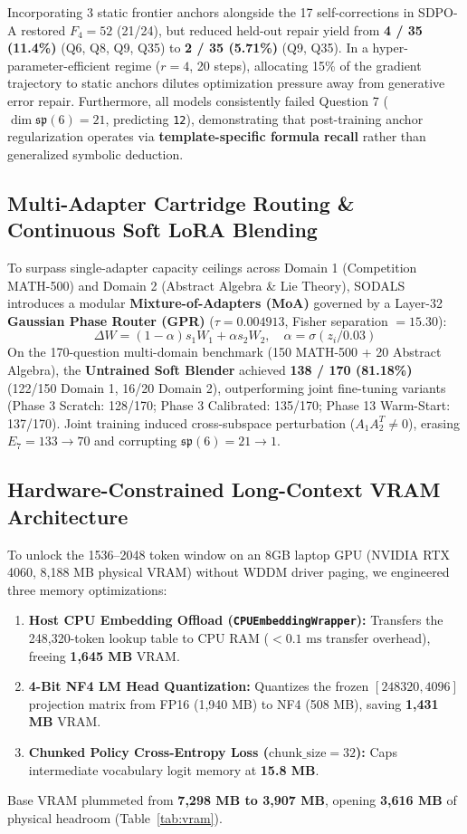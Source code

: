 \documentclass[11pt,a4paper]{article}
\begin{document}
Incorporating 3 static frontier anchors alongside the 17 self-corrections in SDPO-A restored $F_4 = 52$ (21/24), but reduced held-out repair yield from \textbf{4 / 35 (11.4\%)} (Q6, Q8, Q9, Q35) to \textbf{2 / 35 (5.71\%)} (Q9, Q35). In a hyper-parameter-efficient regime ($r=4$, 20 steps), allocating 15\% of the gradient trajectory to static anchors dilutes optimization pressure away from generative error repair. Furthermore, all models consistently failed Question 7 ($\dim \mathfrak{sp}(6) = 21$, predicting \texttt{12}), demonstrating that post-training anchor regularization operates via \textbf{template-specific formula recall} rather than generalized symbolic deduction.

\subsection{Multi-Adapter Cartridge Routing \& Continuous Soft LoRA Blending}

To surpass single-adapter capacity ceilings across Domain 1 (Competition MATH-500) and Domain 2 (Abstract Algebra \& Lie Theory), SODALS introduces a modular \textbf{Mixture-of-Adapters (MoA)} governed by a Layer-32 \textbf{Gaussian Phase Router (GPR)} ($\tau = 0.004913$, Fisher separation $= 15.30$):
\begin{equation}
\Delta W = (1 - \alpha) s_1 W_1 + \alpha s_2 W_2, \quad \alpha = \sigma(z_i / 0.03)
\end{equation}
On the 170-question multi-domain benchmark (150 MATH-500 + 20 Abstract Algebra), the \textbf{Untrained Soft Blender} achieved \textbf{138 / 170 (81.18\%)} (122/150 Domain 1, 16/20 Domain 2), outperforming joint fine-tuning variants (Phase 3 Scratch: 128/170; Phase 3 Calibrated: 135/170; Phase 13 Warm-Start: 137/170). Joint training induced cross-subspace perturbation ($A_1 A_2^T \neq 0$), erasing $E_7 = 133 \to 70$ and corrupting $\mathfrak{sp}(6) = 21 \to 1$.

\subsection{Hardware-Constrained Long-Context VRAM Architecture}

To unlock the 1536--2048 token window on an 8GB laptop GPU (NVIDIA RTX 4060, 8,188 MB physical VRAM) without WDDM driver paging, we engineered three memory optimizations:
\begin{enumerate}
    \item \textbf{Host CPU Embedding Offload (\texttt{CPUEmbeddingWrapper}):} Transfers the 248,320-token lookup table to CPU RAM ($<0.1\text{ ms}$ transfer overhead), freeing \textbf{1,645 MB} VRAM.
    \item \textbf{4-Bit NF4 LM Head Quantization:} Quantizes the frozen $[248320, 4096]$ projection matrix from FP16 (1,940 MB) to NF4 (508 MB), saving \textbf{1,431 MB} VRAM.
    \item \textbf{Chunked Policy Cross-Entropy Loss ($\text{chunk\_size}=32$):} Caps intermediate vocabulary logit memory at \textbf{15.8 MB}.
\end{enumerate}
Base VRAM plummeted from \textbf{7,298 MB to 3,907 MB}, opening \textbf{3,616 MB} of physical headroom (Table~\ref{tab:vram}).
\end{document}
